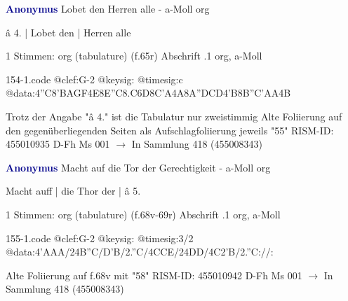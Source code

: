 \documentclass[twocolumn]{book}
\begin{document}
\newline \par \vspace{7pt} \textcolor{darkblue}{\textbf{Anonymus  }}
\newline Lobet den Herren alle - a-Moll
\newline org
\newline \begin{itshape}[f.65r, at left:] â 4. | Lobet den | Herren alle\end{itshape} 
\newline \textcolor{darkblue}{}  1 Stimmen: org (tabulature)  (f.65r)
\newline Abschrift
.1  org, a-Moll  
\begin{filecontents*}{154-1.code}
@clef:G-2
@keysig:
@timesig:c
@data:4''C{8'BA}{GF}4E{8E''C8.C6D}{8C'A}4A{8A''DCD}4'B{8B''C}{'AA}4B
\end{filecontents*}
\newline
%
\newline Trotz der Angabe "â 4." ist die Tabulatur nur zweistimmig
\newline Alte Foliierung auf den gegenüberliegenden Seiten als Aufschlagfoliierung jeweils "55"
\newline RISM-ID: 455010935
\newline D-Fh  Ms 001
\newline $\rightarrow$ In Sammlung 418 (455008343)
      
\newline \par \vspace{7pt} \textcolor{darkblue}{\textbf{Anonymus  }}
\newline Macht auf die Tor der Gerechtigkeit - a-Moll
\newline org
\newline \begin{itshape}[f.68v, at left:] Macht auff | die Thor der | â 5.\end{itshape} 
\newline \textcolor{darkblue}{}  1 Stimmen: org (tabulature)  (f.68v-69r)
\newline Abschrift
.1  org, a-Moll  
\begin{filecontents*}{155-1.code}
@clef:G-2
@keysig:
@timesig:3/2
@data:4'AAA/24B''C/D'B/2.''C/4CCE/24DD/4C2'B/2.''C://:
\end{filecontents*}
\newline
%
\newline Alte Foliierung auf f.68v mit "58"
\newline RISM-ID: 455010942
\newline D-Fh  Ms 001
\newline $\rightarrow$ In Sammlung 418 (455008343)
      
\end{document}
